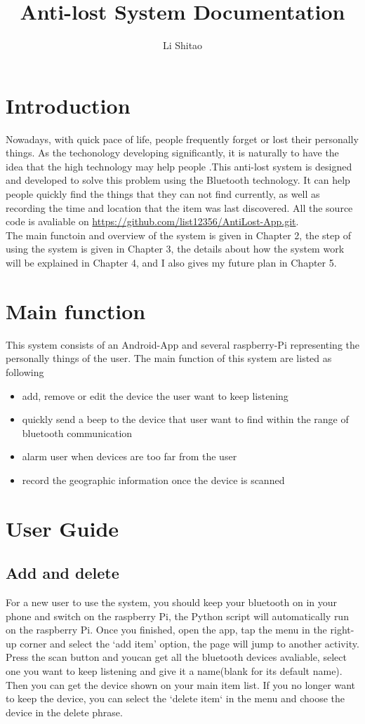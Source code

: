 \documentclass{article}
\begin{document}
\title{Anti-lost System Documentation}
\author{Li Shitao}
\maketitle
\section{Introduction}

Nowadays, with quick pace of life, people frequently forget or lost their personally things. As the techonology developing significantly, it is naturally to have the idea that the high technology may help people .This anti-lost system is designed and developed to solve this problem using the Bluetooth technology. It can help people quickly find the things that they can not find currently, as well as recording the time and location that the item was last discovered. All the source code is avaliable on  \url{https://github.com/list12356/AntiLost-App.git}.\\
The main functoin and overview of the system is given in Chapter 2, the step of using the system is given in Chapter 3, the details about how the system work will be explained in Chapter 4, and I also gives my future plan in Chapter 5.
\section{Main function}
This system consists of an Android-App and several raspberry-Pi representing the personally things of the user. The main function of this system are listed as following
\begin{itemize}
\item add, remove or edit the device the user want to keep listening
\item quickly send a beep to the device that user want to find within the range of bluetooth communication
\item alarm user when devices are too far from the user
\item record the geographic information once the device is scanned
\end{itemize}
\section{User Guide}
\subsection{Add and delete }
For a new user to use the system, you should keep your bluetooth on in your phone and switch on the raspberry Pi, the Python script will automatically run on the raspberry Pi. Once you finished, open the app, tap the menu in the right-up corner and select the `add item' option, the page will jump to another activity. Press the scan button and youcan get all the bluetooth devices avaliable, select one you want to keep listening and give it a name(blank for its default name). Then you can get the device shown on your main item list. If you no longer want to keep the device, you can select the `delete item` in the menu and choose the device in the delete phrase.
\end{document}
